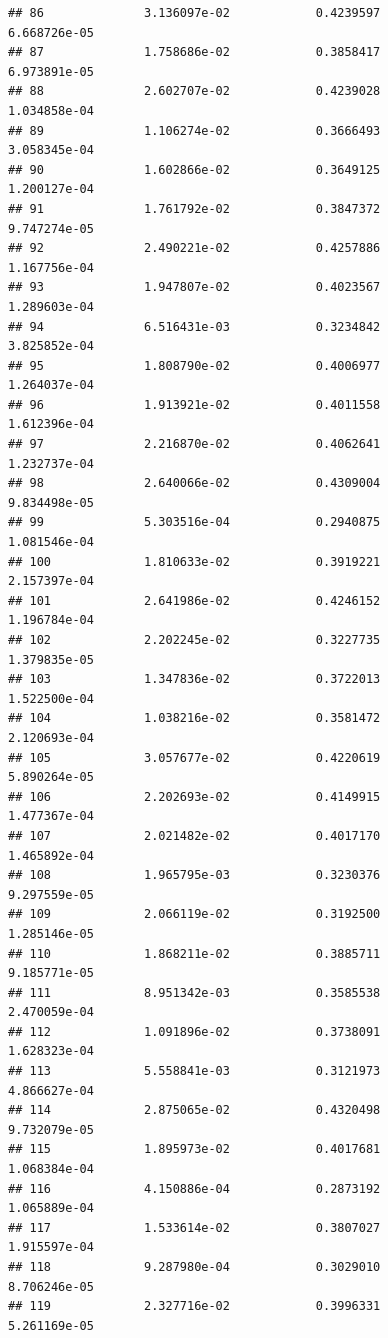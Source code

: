 \documentclass[
]{article}
\begin{document}
\begin{verbatim}
## 86              3.136097e-02            0.4239597            6.668726e-05
## 87              1.758686e-02            0.3858417            6.973891e-05
## 88              2.602707e-02            0.4239028            1.034858e-04
## 89              1.106274e-02            0.3666493            3.058345e-04
## 90              1.602866e-02            0.3649125            1.200127e-04
## 91              1.761792e-02            0.3847372            9.747274e-05
## 92              2.490221e-02            0.4257886            1.167756e-04
## 93              1.947807e-02            0.4023567            1.289603e-04
## 94              6.516431e-03            0.3234842            3.825852e-04
## 95              1.808790e-02            0.4006977            1.264037e-04
## 96              1.913921e-02            0.4011558            1.612396e-04
## 97              2.216870e-02            0.4062641            1.232737e-04
## 98              2.640066e-02            0.4309004            9.834498e-05
## 99              5.303516e-04            0.2940875            1.081546e-04
## 100             1.810633e-02            0.3919221            2.157397e-04
## 101             2.641986e-02            0.4246152            1.196784e-04
## 102             2.202245e-02            0.3227735            1.379835e-05
## 103             1.347836e-02            0.3722013            1.522500e-04
## 104             1.038216e-02            0.3581472            2.120693e-04
## 105             3.057677e-02            0.4220619            5.890264e-05
## 106             2.202693e-02            0.4149915            1.477367e-04
## 107             2.021482e-02            0.4017170            1.465892e-04
## 108             1.965795e-03            0.3230376            9.297559e-05
## 109             2.066119e-02            0.3192500            1.285146e-05
## 110             1.868211e-02            0.3885711            9.185771e-05
## 111             8.951342e-03            0.3585538            2.470059e-04
## 112             1.091896e-02            0.3738091            1.628323e-04
## 113             5.558841e-03            0.3121973            4.866627e-04
## 114             2.875065e-02            0.4320498            9.732079e-05
## 115             1.895973e-02            0.4017681            1.068384e-04
## 116             4.150886e-04            0.2873192            1.065889e-04
## 117             1.533614e-02            0.3807027            1.915597e-04
## 118             9.287980e-04            0.3029010            8.706246e-05
## 119             2.327716e-02            0.3996331            5.261169e-05

\end{verbatim}
\end{document}
